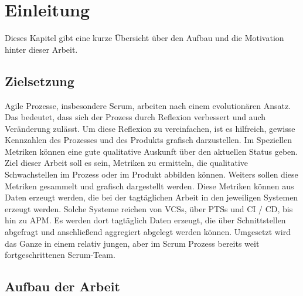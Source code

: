 \chapter{Einleitung}

Dieses Kapitel gibt eine kurze Übersicht über den Aufbau und die Motivation hinter dieser Arbeit.

\section{Zielsetzung}

Agile Prozesse, insbesondere Scrum, arbeiten nach einem evolutionären Ansatz.
Das bedeutet, dass sich der Prozess durch Reflexion verbessert und auch Veränderung zulässt.
Um diese Reflexion zu vereinfachen, ist es hilfreich, gewisse Kennzahlen des Prozesses und des Produkts grafisch darzustellen.
Im Speziellen Metriken können eine gute qualitative Auskunft über den aktuellen Status geben.
Ziel dieser Arbeit soll es sein, Metriken zu ermitteln, die qualitative Schwachstellen im Prozess oder im Produkt abbilden können.
Weiters sollen diese Metriken gesammelt und grafisch dargestellt werden.
Diese Metriken können aus Daten erzeugt werden, die bei der tagtäglichen Arbeit in den jeweiligen Systemen erzeugt werden.
Solche Systeme reichen von \acfp{VCS}, über \acfp{PTS} und \acf{CI} / \acf{CD}, bis hin zu \acf{APM}.
Es werden dort tagtäglich Daten erzeugt, die über Schnittstellen abgefragt und anschließend aggregiert abgelegt werden können.
Umgesetzt wird das Ganze in einem relativ jungen, aber im Scrum Prozess bereits weit fortgeschrittenen Scrum-Team.

\clearpage
\section{Aufbau der Arbeit}

